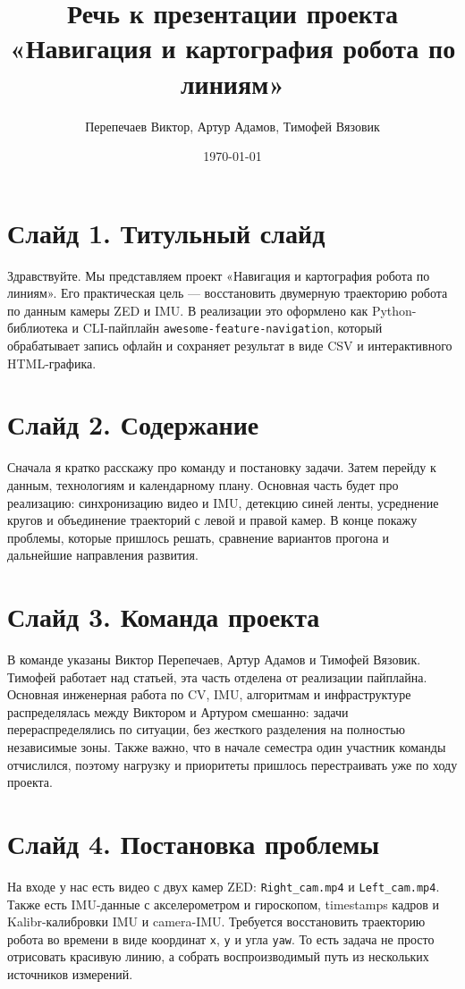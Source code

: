\documentclass[12pt,a4paper]{article}
\title{Речь к презентации проекта «Навигация и картография робота по линиям»}
\author{Перепечаев Виктор, Артур Адамов, Тимофей Вязовик}
\date{\today}
\newcommand{\project}{\texttt{awesome-feature-navigation}}
\newcommand{\code}[1]{\texttt{#1}}
\begin{document}
\sloppy

\maketitle

\section*{Слайд 1. Титульный слайд}

Здравствуйте. Мы представляем проект «Навигация и картография робота по линиям». Его практическая цель --- восстановить двумерную траекторию робота по данным камеры ZED и IMU. В реализации это оформлено как Python-библиотека и CLI-пайплайн \project{}, который обрабатывает запись офлайн и сохраняет результат в виде CSV и интерактивного HTML-графика.

\section*{Слайд 2. Содержание}

Сначала я кратко расскажу про команду и постановку задачи. Затем перейду к данным, технологиям и календарному плану. Основная часть будет про реализацию: синхронизацию видео и IMU, детекцию синей ленты, усреднение кругов и объединение траекторий с левой и правой камер. В конце покажу проблемы, которые пришлось решать, сравнение вариантов прогона и дальнейшие направления развития.

\section*{Слайд 3. Команда проекта}

В команде указаны Виктор Перепечаев, Артур Адамов и Тимофей Вязовик. Тимофей работает над статьей, эта часть отделена от реализации пайплайна. Основная инженерная работа по CV, IMU, алгоритмам и инфраструктуре распределялась между Виктором и Артуром смешанно: задачи перераспределялись по ситуации, без жесткого разделения на полностью независимые зоны. Также важно, что в начале семестра один участник команды отчислился, поэтому нагрузку и приоритеты пришлось перестраивать уже по ходу проекта.

\section*{Слайд 4. Постановка проблемы}

На входе у нас есть видео с двух камер ZED: \code{Right\_cam.mp4} и \code{Left\_cam.mp4}. Также есть IMU-данные с акселерометром и гироскопом, timestamps кадров и Kalibr-калибровки IMU и camera-IMU. Требуется восстановить траекторию робота во времени в виде координат \code{x}, \code{y} и угла \code{yaw}. То есть задача не просто отрисовать красивую линию, а собрать воспроизводимый путь из нескольких источников измерений.
\end{document}
